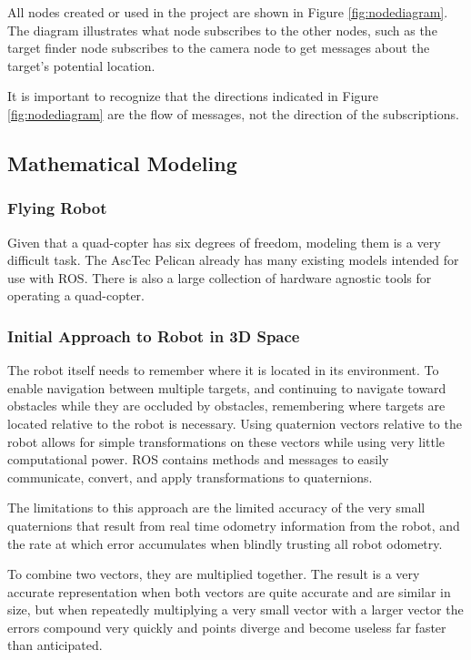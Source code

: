 \documentclass{article}[12]
\begin{document}
	All nodes created or used in the project are shown in Figure \ref{fig:nodediagram}. The diagram illustrates what node subscribes to the other nodes, such as the target finder node subscribes to the camera node to get messages about the target's potential location. 
	
 	It is important to recognize that the directions indicated in Figure \ref{fig:nodediagram} are the flow of messages, not the direction of the subscriptions. 

	\subsection{Mathematical Modeling}
	
		\subsubsection{Flying Robot}
	
		Given that a quad-copter has six degrees of freedom, modeling them is a very difficult task. The AscTec Pelican already has many existing models intended for use with ROS. There is also a large collection of hardware agnostic tools for operating a quad-copter.
	
		\subsubsection{Initial Approach to Robot in 3D Space}
		
		The robot itself needs to remember where it is located in its environment. To enable navigation between multiple targets, and continuing to navigate toward obstacles while they are occluded by obstacles, remembering where targets are located relative to the robot is necessary. Using quaternion vectors relative to the robot allows for simple transformations on these vectors while using very little computational power. \cite{williams2010combining} ROS contains methods and messages to easily communicate, convert, and apply transformations to quaternions.
		
		The limitations to this approach are the limited accuracy of the very small quaternions that result from real time odometry information from the robot, and the rate at which error accumulates when blindly trusting all robot odometry. 
		
		To combine two vectors, they are multiplied together. The result is a very accurate representation when both vectors are quite accurate and are similar in size, but when repeatedly multiplying a very small vector with a larger vector the errors compound very quickly and points diverge and become useless far faster than anticipated.
	
\end{document}
